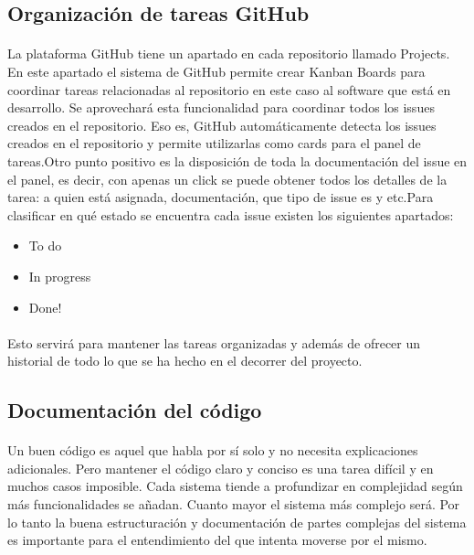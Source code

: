 \subsection{Organización de tareas GitHub}
\paragraph{}
La plataforma GitHub tiene un apartado en cada repositorio llamado Projects. En este apartado el sistema de GitHub permite crear Kanban Boards para coordinar tareas relacionadas al repositorio en este caso al software que está en desarrollo. Se aprovechará esta funcionalidad para coordinar todos los issues creados en el repositorio. Eso es, GitHub automáticamente detecta los issues creados en el repositorio y permite utilizarlas como cards para el panel de tareas.Otro punto positivo es la disposición de toda la documentación del issue en el panel, es decir, con apenas un click se puede obtener todos los detalles de la tarea: a quien está asignada, documentación, que tipo de issue es y etc.Para clasificar en qué estado se encuentra cada issue existen los siguientes apartados:

\begin{itemize}
\item
  To do
\item
  In progress
\item
  Done!
\end{itemize}
\paragraph{}
Esto servirá para mantener las tareas organizadas y además de ofrecer un historial de todo lo que se ha hecho en el decorrer del proyecto.

\subsection{Documentación del código}
\paragraph{}
Un buen código es aquel que habla por sí solo y no necesita explicaciones adicionales. Pero mantener el código claro y conciso es una tarea difícil y en muchos casos imposible. Cada sistema tiende a profundizar en complejidad según más funcionalidades se añadan. Cuanto mayor el sistema más complejo será. Por lo tanto la buena estructuración y documentación de partes complejas del sistema es importante para el entendimiento del que intenta moverse por el mismo.

